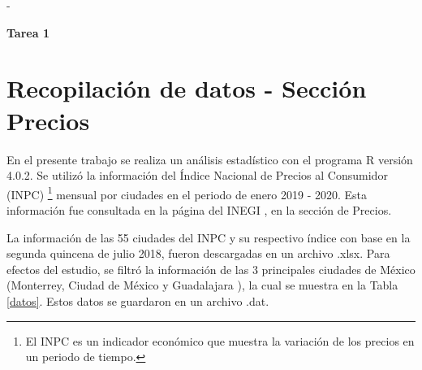 \documentclass[fontsize=12pt]{article}
\begin{document}

\textcolor[rgb]{1,1,1}{-}
\begin{center}
\Large \textbf{Tarea 1}
\end{center}


\section{Recopilación de datos - Sección Precios} \label{recopdedatos}

En el presente trabajo se realiza un análisis estadístico con el programa R versión 4.0.2. Se utilizó la información del Índice Nacional de Precios al Consumidor (INPC) \footnote{El INPC es un indicador económico que muestra la variación de los precios en un periodo de tiempo.} mensual por ciudades en el periodo de enero 2019 - 2020. Esta información fue consultada en la página del INEGI \cite{INEGI}, en la sección de Precios.

La información de las 55 ciudades del INPC y su respectivo índice con base en la segunda quincena de julio 2018, fueron descargadas en un archivo .xlsx. Para efectos del estudio, se filtró la información de las 3 principales ciudades de México (Monterrey, Ciudad de México y Guadalajara ), la cual se muestra en la Tabla \ref{datos}. Estos datos se guardaron en un archivo .dat. 
\end{document}
